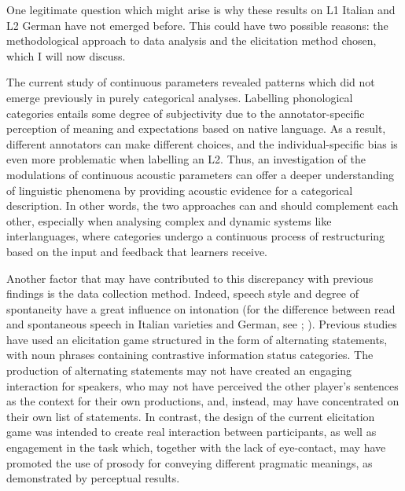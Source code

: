 One legitimate question which might arise is why these results on L1 Italian and L2 German have not emerged before. This could have two possible reasons: the methodological approach to data analysis and the elicitation method chosen, which I will now discuss.

The current study of continuous parameters revealed patterns which did not emerge previously in purely categorical analyses. Labelling phonological categories entails some degree of subjectivity due to the annotator-specific perception of meaning and expectations based on native language. As a result, different annotators can make different choices, and the individual-specific bias is even more problematic when labelling an L2. Thus, an investigation of the modulations of continuous acoustic parameters can offer a deeper understanding of linguistic phenomena by providing acoustic evidence for a categorical description. In other words, the two approaches can and should complement each other, especially when analysing complex and dynamic systems like interlanguages, where categories undergo a continuous process of restructuring based on the input and feedback that learners receive.

Another factor that may have contributed to this discrepancy with previous findings is the data collection method. Indeed, speech style and degree of spontaneity have a great influence on intonation (for the difference between read and spontaneous speech in Italian varieties and German, see \citealt{DeRuiter2015}; \citealt{SavinoRefice1997}). Previous studies have used an elicitation game structured in the form of alternating statements, with noun phrases containing contrastive information status categories. The production of alternating statements may not have created an engaging interaction for speakers, who may not have perceived the other player’s sentences as the context for their own productions, and, instead, may have concentrated on their own list of statements. In contrast, the design of the current elicitation game was intended to create real interaction between participants, as well as engagement in the task which, together with the lack of eye-contact, may have promoted the use of prosody for conveying different pragmatic meanings, as demonstrated by perceptual results.

